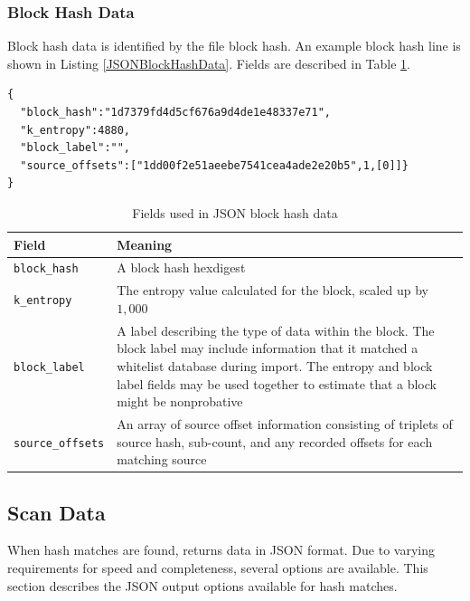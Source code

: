 \documentclass[11pt,fleqn]{article} %
\begin{document}
\subsubsection{Block Hash Data}
Block hash data is identified by the file block hash.  An example block hash line is shown in Listing \ref{JSONBlockHashData}. Fields are described in Table \ref{tab:JSONBlockHashData}.\\

\lstset{style=customfile}
\begin{lstlisting}[float, caption={Example JSON block hash data used during import/export}, label=JSONBlockHashData]
{
  "block_hash":"1d7379fd4d5cf676a9d4de1e48337e71",
  "k_entropy":4880,
  "block_label":"",
  "source_offsets":["1dd00f2e51aeebe7541cea4ade2e20b5",1,[0]]}
}
\end{lstlisting}

\begin{table}[!ht]

\centering
\caption{Fields used in JSON block hash data}
\label{tab:JSONBlockHashData}
\begin{tabular}{|p{5 cm}|p{8.8 cm}|}
\hline \hline
\textbf{Field} & \textbf{Meaning} \\
\hline
\verb+block_hash+ & A block hash hexdigest\\
\hline
\verb+k_entropy+ & The entropy value calculated for the block, scaled up by $1,000$\\
\hline
\verb+block_label+ & A label describing the type of data within the block. The block label may include information that it matched a whitelist database during import. The entropy and block label fields may be used together to estimate that a block might be nonprobative\\
\hline
\verb+source_offsets+ & An array of source offset information consisting of triplets of source hash, sub-count, and any recorded offsets for each matching source\\
\hline
\end{tabular}
\end{table}

\subsection{Scan Data}
\label{ScanData}
When hash matches are found, \hdb returns data in JSON format. Due to varying requirements for speed and completeness, several options are available. This section describes the JSON output options available for hash matches.\\
\end{document}
